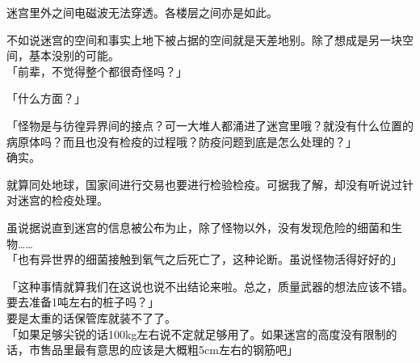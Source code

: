 迷宫里外之间电磁波无法穿透。各楼层之间亦是如此。

不如说迷宫的空间和事实上地下被占据的空间就是天差地别。除了想成是另一块空间，基本没别的可能。\\

「前辈，不觉得整个都很奇怪吗？」

「什么方面？」

「怪物是与彷徨异界间的接点？可一大堆人都涌进了迷宫里哦？就没有什么位置的病原体吗？而且也没有检疫的过程哦？防疫问题到底是怎么处理的？」\\

确实。

就算同处地球，国家间进行交易也要进行检验检疫。可据我了解，却没有听说过针对迷宫的检疫处理。

虽说据说直到迷宫的信息被公布为止，除了怪物以外，没有发现危险的细菌和生物……\\

「也有异世界的细菌接触到氧气之后死亡了，这种论断。虽说怪物活得好好的」

「这种事情就算我们在这说也说不出结论来啦。总之，质量武器的想法应该不错。要去准备1吨左右的桩子吗？」\\

要是太重的话保管库就装不了了。\\

「如果足够尖锐的话100kg左右说不定就足够用了。如果迷宫的高度没有限制的话，市售品里最有意思的应该是大概粗5cm左右的钢筋吧」\\

